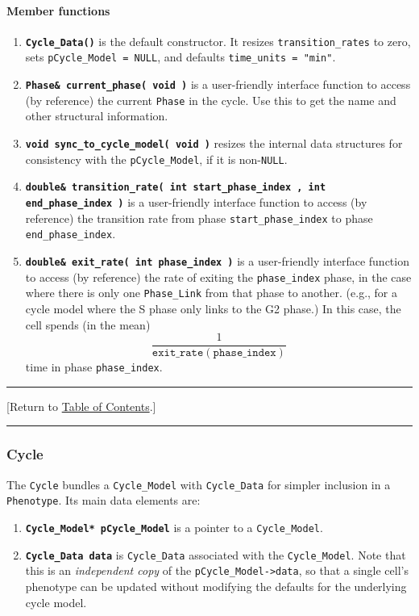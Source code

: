 \documentclass[12pt]{article}
\newcommand{\beq}{\begin{equation}}
\newcommand{\eeq}{\end{equation}}
\renewcommand{\v}{\verb}
\newcommand{\smallcode}[1]{\textbf{\texttt{#1}}}
\newcommand{\blue}[1]{\textcolor{blue}{#1}}
\newcommand{\DONE}{}%
\newcommand{\TOClink}{\begin{center}\hrule\vskip-10pt\phantom{.}\hfill[Return to \hyperlink{TOC}{Table of Contents}.]\hfill\phantom{.}\vskip3pt\hrule\end{center}}
\begin{document}
\paragraph{Member functions}
\begin{enumerate}
\item
\smallcode{Cycle\_Data()} is the default constructor. It resizes 
\v|transition_rates| to zero, sets \hfill\break
\v|pCycle_Model = NULL|, and defaults \v|time_units = "min"|. 

\item 
\smallcode{Phase\& current\_phase( void )} is a 
user-friendly interface function 
to access (by reference) the current \v|Phase| in the cycle. Use this to 
get the name and other structural information. 

\item 
\smallcode{void sync\_to\_cycle\_model( void )} resizes the internal data structures 
for consistency with the \v|pCycle_Model|, if it is non-\v|NULL|. 

\item 
\smallcode{double\& transition\_rate( int start\_phase\_index , int end\_phase\_index )} 
is a user-\hfill\break friendly interface function to access (by reference) the 
transition rate from phase \v|start_phase_index| to phase 
\v|end_phase_index|. 

\item
\smallcode{double\& exit\_rate( int\ phase\_index )} is a user-friendly interface 
function to access (by reference) the rate of exiting the 
\v|phase_index| phase, in the case where there is only one  
\v|Phase_Link| from that phase to another.  (e.g., for a cycle model 
where the S phase only links to the G2 phase.) In this case, 
the cell spends (in the mean) 
\beq
\frac{1}{\texttt{exit\_rate}(\texttt{phase\_index}) }\eeq
time in phase \v|phase_index|. 

\end{enumerate}

\TOClink 

\subsubsection{Cycle \DONE}
\label{sec:Cycle_Class}
The \v|Cycle| bundles a \v|Cycle_Model| with \v|Cycle_Data| for simpler 
inclusion in a \v|Phenotype|. Its main data elements are: 
\begin{enumerate}
\item 
\smallcode{Cycle\_Model* pCycle\_Model} is a pointer to a \v|Cycle_Model|. 

\item 
\smallcode{Cycle\_Data data} is \v|Cycle_Data| associated with the \v|Cycle_Model|. 
Note that this is an \emph{independent copy} of the 
\v|pCycle_Model->data|, so that a single cell's phenotype can be updated 
without modifying the defaults for the underlying cycle model. 

\end{enumerate}
\end{document}
